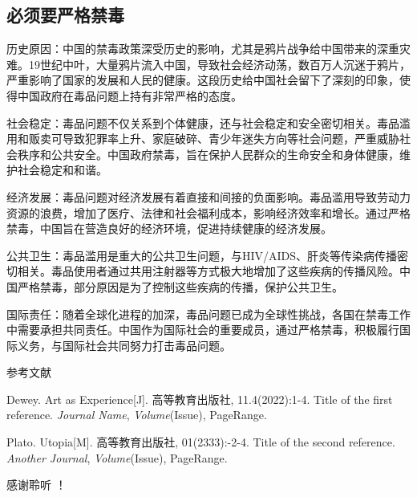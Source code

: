 \documentclass[10pt,a4paper]{beamer} %
\begin{document}
		\subsection{必须要严格禁毒}
		\begin{frame}
			历史原因：中国的禁毒政策深受历史的影响，尤其是鸦片战争给中国带来的深重灾难。19世纪中叶，大量鸦片流入中国，导致社会经济动荡，数百万人沉迷于鸦片，严重影响了国家的发展和人民的健康。这段历史给中国社会留下了深刻的印象，使得中国政府在毒品问题上持有非常严格的态度。
			
			社会稳定：毒品问题不仅关系到个体健康，还与社会稳定和安全密切相关。毒品滥用和贩卖可导致犯罪率上升、家庭破碎、青少年迷失方向等社会问题，严重威胁社会秩序和公共安全。中国政府禁毒，旨在保护人民群众的生命安全和身体健康，维护社会稳定和和谐。
			
			经济发展：毒品问题对经济发展有着直接和间接的负面影响。毒品滥用导致劳动力资源的浪费，增加了医疗、法律和社会福利成本，影响经济效率和增长。通过严格禁毒，中国旨在营造良好的经济环境，促进持续健康的经济发展。
			
			公共卫生：毒品滥用是重大的公共卫生问题，与HIV/AIDS、肝炎等传染病传播密切相关。毒品使用者通过共用注射器等方式极大地增加了这些疾病的传播风险。中国严格禁毒，部分原因是为了控制这些疾病的传播，保护公共卫生。
			
			国际责任：随着全球化进程的加深，毒品问题已成为全球性挑战，各国在禁毒工作中需要承担共同责任。中国作为国际社会的重要成员，通过严格禁毒，积极履行国际义务，与国际社会共同努力打击毒品问题。
		\end{frame}

	
	\appendix
	\begin{frame}{参考文献}
		\begin{thebibliography}{99} %
			Dewey. Art as Experience[J]. 高等教育出版社, 11.4(2022):1-4.
			\newblock Title of the first reference.
			\newblock \emph{Journal Name}, \emph{Volume}(Issue), PageRange.
			
			Plato. Utopia[M]. 高等教育出版社, 01(2333):-2-4.
			\newblock Title of the second reference.
			\newblock \emph{Another Journal}, \emph{Volume}(Issue), PageRange.
		\end{thebibliography}
		
		
	\end{frame}
	
	\begin{frame}[plain,c]
		\begin{center}
			\Huge 感谢聆听 ！
		\end{center}
	\end{frame}
	
\end{document}
